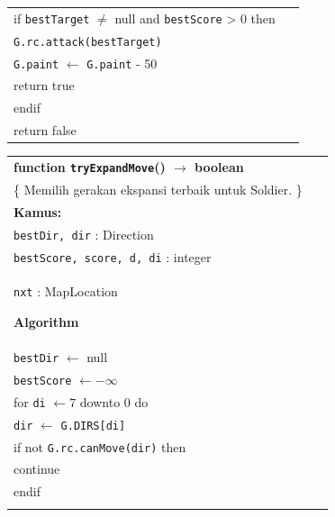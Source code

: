 \documentclass{article}
\newenvironment{pseudobox}
{
\centering
\begin{longtable}{|p{0.94\linewidth}|}
\hline
}
{
\\ \hline
\end{longtable}
\vspace{0.05cm}
}
\begin{document}
\begin{enumerate}[label=\alph*.]
\begin{enumerate}[label=\alph*.]
\begin{pseudobox}
\hspace*{1.5em}if \texttt{bestTarget} $\neq$ null and \texttt{bestScore} > 0 then \\
\hspace*{3em}\texttt{G.rc.attack(bestTarget)} \\
\hspace*{3em}\texttt{G.paint} $\leftarrow$ \texttt{G.paint} - 50 \\
\hspace*{3em}return true \\
\hspace*{1.5em}endif \\

\hspace*{1.5em}return false
\end{pseudobox}

\begin{pseudobox}
\textbf{function \texttt{tryExpandMove}() $\rightarrow$ boolean} \\
\{ Memilih gerakan ekspansi terbaik untuk Soldier. \} \\

\textbf{Kamus:} \\
\hspace*{1.5em}\texttt{bestDir, dir} : Direction \\
\hspace*{1.5em}\texttt{bestScore, score, d, di} : integer \\
\hspace*{1.5em}\texttt{nxt} : MapLocation

\textbf{Algorithm} \\
\hspace*{1.5em}\texttt{bestDir} $\leftarrow$ null \\
\hspace*{1.5em}\texttt{bestScore} $\leftarrow -\infty$ \\

\hspace*{1.5em}for \texttt{di} $\leftarrow 7$ downto 0 do \\
\hspace*{3em}\texttt{dir} $\leftarrow$ \texttt{G.DIRS[di]} \\
\hspace*{3em}if not \texttt{G.rc.canMove(dir)} then \\
\hspace*{4.5em}continue \\
\hspace*{3em}endif \\


\end{pseudobox}
\end{enumerate}
\end{enumerate}
\end{document}
